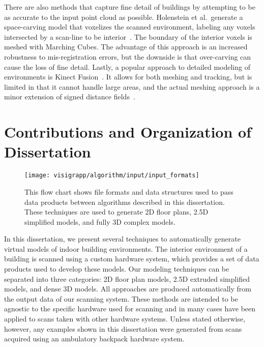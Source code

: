 \documentclass[12pt,onecolumn,oneside]{book}
\begin{document}
There are also methods that capture fine detail of buildings by attempting to be as accurate to the input point cloud as possible.  Holenstein et al.\ generate a space-carving model that voxelizes the scanned environment, labeling any voxels intersected by a scan-line to be interior~\cite{Carving}.  The boundary of the interior voxels is meshed with Marching Cubes.  The advantage of this approach is an increased robustness to mis-registration errors, but the downside is that over-carving can cause the loss of fine detail.  Lastly, a popular approach to detailed modeling of environments is Kinect Fusion~\cite{KinectFusion,Kintinuous}.  It allows for both meshing and tracking, but is limited in that it cannot handle large areas, and the actual meshing approach is a minor extension of signed distance fields~\cite{SignedDistanceFields}. 

\section{Contributions and Organization of Dissertation}
\label{sec:organization}

\begin{figure}[t]
	\centering
	\centerline{\texttt{[image: visigrapp/algorithm/input/input\_formats]}}

	\caption[Data flow chart of algorithms in this dissertation.]{This flow chart shows file formats and data structures used to pass data products between algorithms described in this dissertation.  These techniques are used to generate 2D floor plans, 2.5D simplified models, and fully 3D complex models.}
	\label{fig:dataflowchart}
\end{figure}

In this dissertation, we present several techniques to automatically generate virtual models of indoor building environments.  The interior environment of a building is scanned using a custom hardware system, which provides a set of data products used to develop these models.  Our modeling techniques can be separated into three categories:  2D floor plan models, 2.5D extruded simplified models, and dense 3D models.  All approaches are produced automatically from the output data of our scanning system.  These methods are intended to be agnostic to the specific hardware used for scanning and in many cases have been applied to scans taken with other hardware systems.  Unless stated otherwise, however, any examples shown in this dissertation were generated from scans acquired using an ambulatory backpack hardware system.
\end{document}
